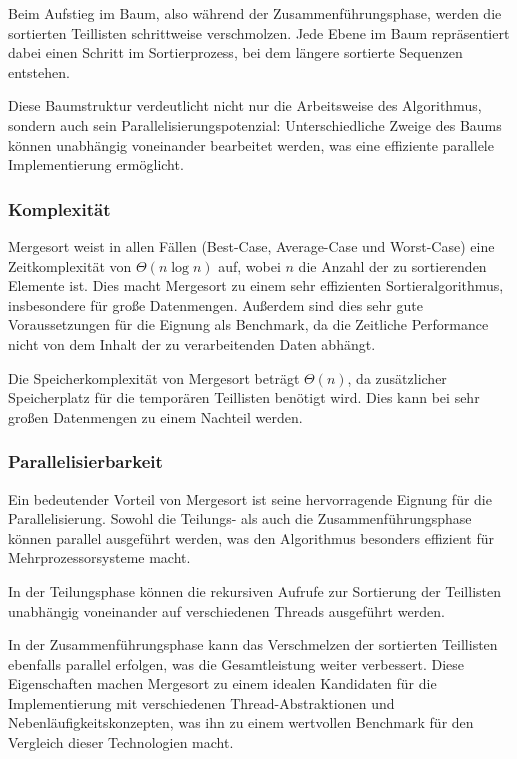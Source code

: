 \documentclass[fontsize=12pt,paper=a4,twoside=semi,parskip=half-,headsepline,headinclude]{scrreprt}
\begin{document}
Beim Aufstieg im Baum, also während der Zusammenführungsphase, werden die sortierten Teillisten schrittweise verschmolzen. Jede Ebene im Baum repräsentiert dabei einen Schritt im Sortierprozess, bei dem längere sortierte Sequenzen entstehen.

Diese Baumstruktur verdeutlicht nicht nur die Arbeitsweise des Algorithmus, sondern auch sein Parallelisierungspotenzial: Unterschiedliche Zweige des Baums können unabhängig voneinander bearbeitet werden, was eine effiziente parallele Implementierung ermöglicht.

\subsubsection{Komplexität}

Mergesort weist in allen Fällen (Best-Case, Average-Case und Worst-Case) eine Zeitkomplexität von $\Theta(n \log n)$ auf, wobei $n$ die Anzahl der zu sortierenden Elemente ist. Dies macht Mergesort zu einem sehr effizienten Sortieralgorithmus, insbesondere für große Datenmengen. Außerdem sind dies sehr gute Voraussetzungen für die Eignung als Benchmark, da die Zeitliche Performance nicht von dem Inhalt der zu verarbeitenden Daten abhängt.\cite{Cormen2022}

Die Speicherkomplexität von Mergesort beträgt $\Theta(n)$, da zusätzlicher Speicherplatz für die temporären Teillisten benötigt wird. Dies kann bei sehr großen Datenmengen zu einem Nachteil werden.

\subsubsection{Parallelisierbarkeit}

Ein bedeutender Vorteil von Mergesort ist seine hervorragende Eignung für die Parallelisierung. Sowohl die Teilungs- als auch die Zusammenführungsphase können parallel ausgeführt werden, was den Algorithmus besonders effizient für Mehrprozessorsysteme macht.

In der Teilungsphase können die rekursiven Aufrufe zur Sortierung der Teillisten unabhängig voneinander auf verschiedenen Threads ausgeführt werden.

In der Zusammenführungsphase kann das Verschmelzen der sortierten Teillisten ebenfalls parallel erfolgen, was die Gesamtleistung weiter verbessert.
Diese Eigenschaften machen Mergesort zu einem idealen Kandidaten für die Implementierung mit verschiedenen Thread-Abstraktionen und Nebenläufigkeitskonzepten, was ihn zu einem wertvollen Benchmark für den Vergleich dieser Technologien macht.
\end{document}

